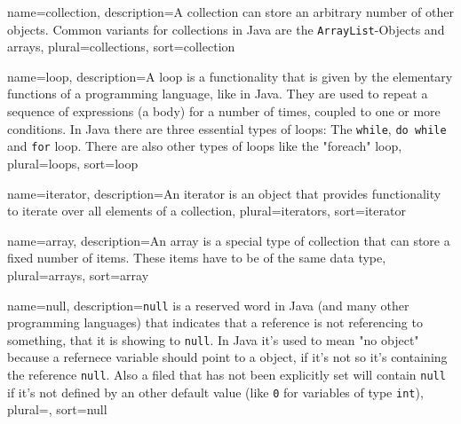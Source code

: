 {
	name=collection,
	description={A collection can store an arbitrary number of other 
		objects. Common variants for collections in Java are the
		\lstinline?ArrayList?-Objects and arrays},
	plural=collections,
	sort=collection
}

{
	name=loop,
	description={A loop is a functionality that is given by the 
		elementary functions of a programming language, like in Java.
		They are used to repeat a sequence of expressions (a body)
		for a number of times, coupled to one or more conditions.
		In Java there are three essential types of loops: 
		The \lstinline?while?, \lstinline?do while? and
		\lstinline?for? loop. There are also other types of loops
		like the "foreach" loop},
	plural=loops,
	sort=loop
}

{
	name=iterator,
	description={An iterator is an object that provides functionality to
		iterate over all elements of a collection},
	plural=iterators,
	sort=iterator
}

{
	name=array,
	description={An array is a special type of collection that can store
		a fixed number of items. These items have to be of the same 
		data type},
	plural=arrays,
	sort=array
}

{
	name=null,
	description={\lstinline?null? is a reserved word in Java (and many
		other programming languages) that indicates that a reference
		is not referencing to something, that it is showing to 
		\lstinline?null?. In Java it's used to mean "no object" 
		because a refernece variable should point to a object, if it's
		not so it's containing the reference \lstinline?null?. Also
		a filed that has not been explicitly set will contain 
		\lstinline?null? if it's not defined by an other default value
		(like \lstinline?0? for variables of type  \lstinline?int?)},
	plural=,
	sort=null
}
